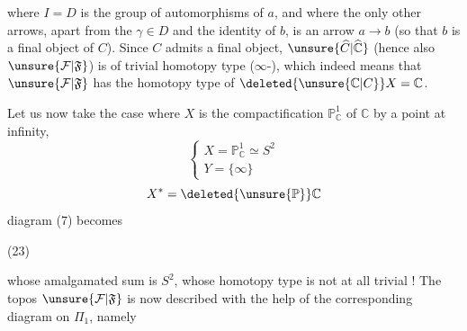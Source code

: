 where $I=D$ is the group of automorphisms of $a$, and where
the only other arrows, apart from the $\gamma\in D$ and
the identity of $b$, is an arrow $a\longrightarrow b$ (so
that $b$ is a final object of $C$). Since
$C$ admits a final object, $\unsure{\widehat C|\widehat{\mathbb C}}$  (hence also
$\unsure{\mathcal F|\mathfrak F}$) is of trivial homotopy type ($\infty$-),
which indeed means that $\unsure{\mathcal F|\mathfrak F}$ has the
homotopy type of $\deleted{\unsure{\mathbb C|C}}X=\mathbb C$.

Let us now take the case where $X$ is the
compactification $\mathbb P^1_{\mathbb C}$ of $\mathbb C$ by a point at infinity,
\[
\left\{\begin{array}{l}
X=\mathbb P^1_{\mathbb C}\simeq S^2\\
Y=\{\infty\}
\end{array}\right.
\]
\[
X^*=\deleted{\unsure{\mathbb P}}\mathbb C
\]
diagram (7) becomes

\noindent (23)

whose amalgamated sum is $S^2$, whose
homotopy type is not at all trivial !
The topos $\unsure{\mathcal F|\mathfrak F}$ is now described
with the help of the corresponding diagram on  $\Pi_1$,
namely
